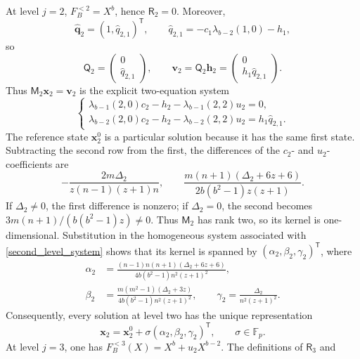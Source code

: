 \documentclass[10pt,a4paper]{amsart}
\newcommand{\F}{\mathbb{F}_p}
\begin{document}
At level $j=2$, $F_B^{<2}=X^b$, hence $\mathsf R_2=0$.  Moreover,
\[
 \widehat{\mathbf q}_2=(1,\widehat q_{2,1})^{\mathsf T},\qquad
 \widehat q_{2,1}=-c_1\lambda_{b-2}(1,0)-h_1,
\]
so
\[
 \mathsf Q_2=
 \begin{pmatrix}0\\ \widehat q_{2,1}\end{pmatrix},\qquad
 \mathbf v_2=\mathsf Q_2\mathbf h_2
 =\begin{pmatrix}0\\ h_1\widehat q_{2,1}\end{pmatrix}.
\]
Thus $\mathsf M_2\mathbf x_2=\mathbf v_2$ is the explicit two-equation
system
\begin{equation}\label{second_level_system}
\begin{cases}
 \lambda_{b-1}(2,0)c_2-h_2-\lambda_{b-1}(2,2)u_2=0,\\
 \lambda_{b-2}(2,0)c_2-h_2-\lambda_{b-2}(2,2)u_2
      =h_1\widehat q_{2,1}.
\end{cases}
\end{equation}
The reference state $\mathbf x_2^0$ is a particular solution because
it has the same first state.  Subtracting the second row from the first,
the differences of the $c_2$- and $u_2$-coefficients are
\[
 -\frac{2m\Delta_2}{z(n-1)(z+1)n},\qquad
 \frac{m(n+1)(\Delta_2+6z+6)}{2b(b^2-1)z(z+1)}.
\]
If $\Delta_2\ne0$, the first difference is nonzero; if
$\Delta_2=0$, the second becomes
$3m(n+1)/(b(b^2-1)z)\ne0$.  Thus $\mathsf M_2$ has rank two, so its kernel is
one-dimensional.  Substitution in the homogeneous system associated with
\eqref{second_level_system} shows that its kernel is spanned by
$(\alpha_2,\beta_2,\gamma_2)^{\mathsf T}$, where
\begin{equation}\label{alpha2beta2}
\begin{aligned}
 \alpha_2&=\frac{(n-1)n(n+1)(\Delta_2+6z+6)}
                  {4b(b^2-1)n^2(z+1)^2},\\
 \beta_2&=\frac{m(m^2-1)(\Delta_2+3z)}
                  {4b(b^2-1)n^2(z+1)^2},\qquad
 \gamma_2=\frac{\Delta_2}{n^2(z+1)^2}.
\end{aligned}
\end{equation}
Consequently, every solution at level two has the unique representation
\begin{equation}\label{mregsecond}
 \mathbf x_2=\mathbf x_2^0+
       \sigma(\alpha_2,\beta_2,\gamma_2)^{\mathsf T},
       \qquad \sigma\in\F.
\end{equation}
At level $j=3$, one has
$F_B^{<3}(X)=X^b+u_2X^{b-2}$.  The definitions of $\mathsf R_3$ and
\end{document}
